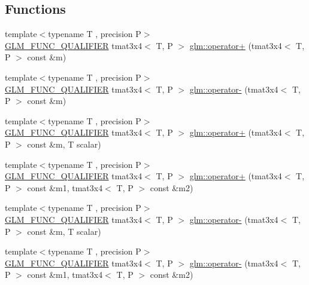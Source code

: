 \subsection*{Functions}
\begin{DoxyCompactItemize}
\item 
{\footnotesize template$<$typename T , precision P$>$ }\\\mbox{\hyperlink{setup_8hpp_a33fdea6f91c5f834105f7415e2a64407}{G\+L\+M\+\_\+\+F\+U\+N\+C\+\_\+\+Q\+U\+A\+L\+I\+F\+I\+ER}} tmat3x4$<$ T, P $>$ \mbox{\hyperlink{namespaceglm_a22ac402749dde369e329512ca3b12bc7}{glm\+::operator+}} (tmat3x4$<$ T, P $>$ const \&m)
\item 
{\footnotesize template$<$typename T , precision P$>$ }\\\mbox{\hyperlink{setup_8hpp_a33fdea6f91c5f834105f7415e2a64407}{G\+L\+M\+\_\+\+F\+U\+N\+C\+\_\+\+Q\+U\+A\+L\+I\+F\+I\+ER}} tmat3x4$<$ T, P $>$ \mbox{\hyperlink{namespaceglm_a1322505211ba57518d78489694f2a16c}{glm\+::operator-\/}} (tmat3x4$<$ T, P $>$ const \&m)
\item 
{\footnotesize template$<$typename T , precision P$>$ }\\\mbox{\hyperlink{setup_8hpp_a33fdea6f91c5f834105f7415e2a64407}{G\+L\+M\+\_\+\+F\+U\+N\+C\+\_\+\+Q\+U\+A\+L\+I\+F\+I\+ER}} tmat3x4$<$ T, P $>$ \mbox{\hyperlink{namespaceglm_a4dac54fa891bb6fb3bc975c094249bfa}{glm\+::operator+}} (tmat3x4$<$ T, P $>$ const \&m, T scalar)
\item 
{\footnotesize template$<$typename T , precision P$>$ }\\\mbox{\hyperlink{setup_8hpp_a33fdea6f91c5f834105f7415e2a64407}{G\+L\+M\+\_\+\+F\+U\+N\+C\+\_\+\+Q\+U\+A\+L\+I\+F\+I\+ER}} tmat3x4$<$ T, P $>$ \mbox{\hyperlink{namespaceglm_a561a98c191b0a0dd371b7a076cda269d}{glm\+::operator+}} (tmat3x4$<$ T, P $>$ const \&m1, tmat3x4$<$ T, P $>$ const \&m2)
\item 
{\footnotesize template$<$typename T , precision P$>$ }\\\mbox{\hyperlink{setup_8hpp_a33fdea6f91c5f834105f7415e2a64407}{G\+L\+M\+\_\+\+F\+U\+N\+C\+\_\+\+Q\+U\+A\+L\+I\+F\+I\+ER}} tmat3x4$<$ T, P $>$ \mbox{\hyperlink{namespaceglm_a5e302113e47a053aebb48f1cd832643e}{glm\+::operator-\/}} (tmat3x4$<$ T, P $>$ const \&m, T scalar)
\item 
{\footnotesize template$<$typename T , precision P$>$ }\\\mbox{\hyperlink{setup_8hpp_a33fdea6f91c5f834105f7415e2a64407}{G\+L\+M\+\_\+\+F\+U\+N\+C\+\_\+\+Q\+U\+A\+L\+I\+F\+I\+ER}} tmat3x4$<$ T, P $>$ \mbox{\hyperlink{namespaceglm_a6349098541c329f41e900eaf05eca9f7}{glm\+::operator-\/}} (tmat3x4$<$ T, P $>$ const \&m1, tmat3x4$<$ T, P $>$ const \&m2)

\end{DoxyCompactItemize}
